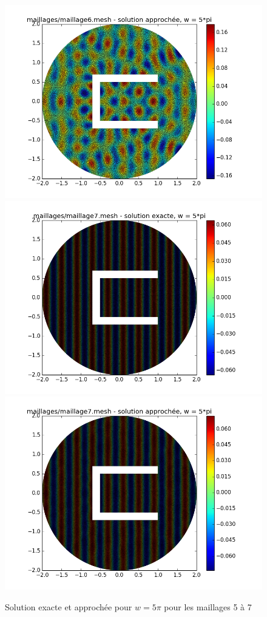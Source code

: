 \documentclass[a4paper,12pt]{article}
\begin{document}
\begin{figure}[H]
\begin{center}
        \includegraphics[scale = 0.3]{image/5Pi/figure_6-6}
        \includegraphics[scale = 0.3]{image/5Pi/figure_7}
        \includegraphics[scale = 0.3]{image/5Pi/figure_7-7}
\end{center}
\caption{Solution exacte et approchée pour $w = 5\pi$ pour les maillages 5 à 7}
\end{figure}
\end{document}
